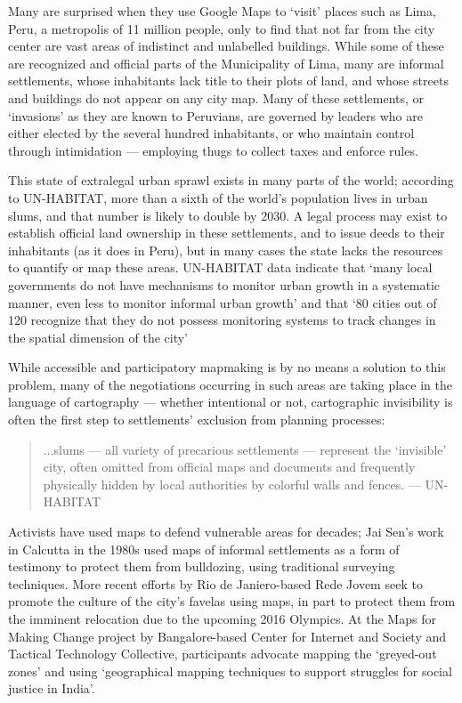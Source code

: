 \documentclass[11pt,oneside,notitlepage]{report}
\begin{document}
Many are surprised when they use Google Maps to `visit' places such as Lima, Peru, a metropolis of 11 million people, only to find that not far from the city center are vast areas of indistinct and unlabelled buildings. While some of these are recognized and official parts of the Municipality of Lima, many are informal settlements, whose inhabitants lack title to their plots of land, and whose streets and buildings do not appear on any city map. Many of these settlements, or `invasions' as they are known to Peruvians, are governed by leaders who are either elected by the several hundred inhabitants, or who maintain control through intimidation --- employing thugs to collect taxes and enforce rules. 

This state of extralegal urban sprawl exists in many parts of the world; according to UN-HABITAT, more than a sixth of the world's population lives in urban slums, and that number is likely to double by 2030. \cite{unhabitat2003challenge} A legal process may exist to establish official land ownership in these settlements, and to issue deeds to their inhabitants (as it does in Peru), but in many cases the state lacks the resources to quantify or map these areas. UN-HABITAT data indicate that `many local governments do not have mechanisms to monitor urban growth in a systematic manner, even less to monitor informal urban growth' and that `80 cities out of 120 recognize that they do not possess monitoring systems to track changes in the spatial dimension of the city' \cite{unhabitat2008slum}

While accessible and participatory mapmaking is by no means a solution to this problem, many of the negotiations occurring in such areas are taking place in the language of cartography --- whether intentional or not, cartographic invisibility is often the first step to settlements' exclusion from planning processes: 

\begin{quote}
...slums --- all variety of precarious settlements --- represent the `invisible' city, often omitted from official maps and documents and frequently physically hidden by local authorities by colorful walls and fences. 
--- UN-HABITAT \cite{unhabitat2003slums}
\end{quote}

Activists have used maps to defend vulnerable areas for decades; Jai Sen's work in Calcutta in the 1980s used maps of informal settlements as a form of testimony to protect them from bulldozing, using traditional surveying techniques. More recent efforts by Rio de Janiero-based Rede Jovem seek to promote the culture of the city's favelas using maps, in part to protect them from the imminent relocation due to the upcoming 2016 Olympics. At the Maps for Making Change project by Bangalore-based Center for Internet and Society and Tactical Technology Collective, participants advocate mapping the `greyed-out zones' and using  `geographical mapping techniques to support struggles for social justice in India'. \cite{sen2010maps}
\end{document}
